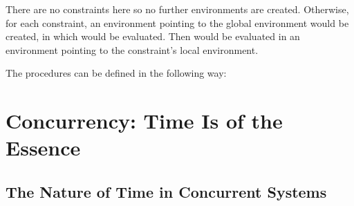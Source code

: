 \begin{exe}[3.36]
\begin{itemize}
            There are no constraints here so no further environments are 
            created. Otherwise, for each constraint, an environment pointing to 
            the global environment would be created, in which 
             would be evaluated. Then 
            \newline
             would be evaluated in an 
            environment pointing to the constraint’s local environment.
    \end{itemize}
\end{exe}

\begin{exe}[3.37]
    The procedures can be defined in the following way:
\end{exe}

\section{Concurrency: Time Is of the Essence}

\subsection{The Nature of Time in Concurrent Systems}

